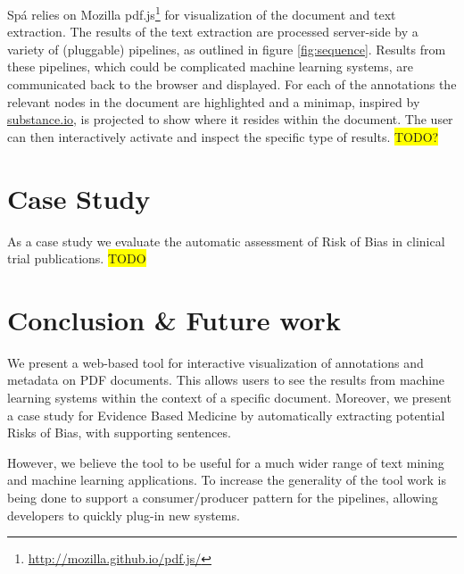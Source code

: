 \documentclass[runningheads,a4paper]{llncs}
\newcommand{\highlight}[1]{\colorbox{yellow}{#1}}
\begin{document}
Spá relies on Mozilla pdf.js\footnote{\url{http://mozilla.github.io/pdf.js/}} for visualization of the document and text extraction.
The results of the text extraction are processed server-side by a variety of (pluggable) pipelines, as outlined in figure \ref{fig:sequence}.
Results from these pipelines, which could be complicated machine learning systems, are communicated back to the browser and displayed.
For each of the annotations the relevant nodes in the document are highlighted and a minimap, inspired by \href{http://substance.io/}{substance.io}, is projected to show where it resides within the document.
The user can then interactively activate and inspect the specific type of results.
\highlight{TODO?}
\section{Case Study}
\label{sec-3}
As a case study we evaluate the automatic assessment of Risk of Bias in clinical trial publications.
\highlight{TODO}
\section{Conclusion \& Future work}
\label{sec-4}
We present a web-based tool for interactive visualization of annotations and metadata on PDF documents.
This allows users to see the results from machine learning systems within the context of a specific document.
Moreover, we present a case study for Evidence Based Medicine by automatically extracting potential Risks of Bias, with supporting sentences.

However, we believe the tool to be useful for a much wider range of text mining and machine learning applications.
To increase the generality of the tool work is being done to support a consumer/producer pattern for the pipelines, allowing developers to quickly plug-in new systems.





\end{document}
